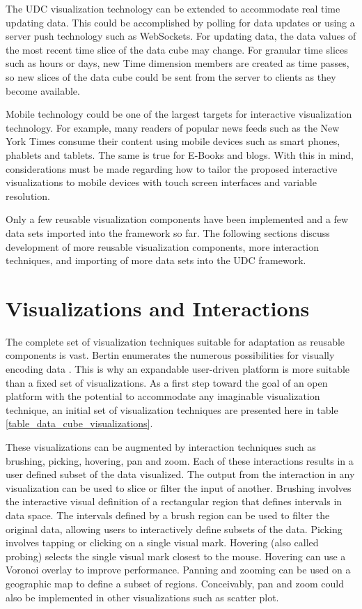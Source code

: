 The UDC visualization technology can be extended to accommodate real time updating data. This could be accomplished by polling for data updates or using a server push technology such as WebSockets. For updating data, the data values of the most recent time slice of the data cube may change. For granular time slices such as hours or days, new Time dimension members are created as time passes, so new slices of the data cube could be sent from the server to clients as they become available.

Mobile technology could be one of the largest targets for interactive visualization technology. For example, many readers of popular news feeds such as the New York Times consume their content using mobile devices such as smart phones, phablets and tablets. The same is true for E-Books and blogs. With this in mind, considerations must be made regarding how to tailor the proposed interactive visualizations to mobile devices with touch screen interfaces and variable resolution.

Only a few reusable visualization components have been implemented and a few data sets imported into the framework so far. The following sections discuss development of more reusable visualization components, more interaction techniques, and importing of more data sets into the UDC framework.

\section{Visualizations and Interactions}
The complete set of visualization techniques suitable for adaptation as reusable components is vast. Bertin enumerates the numerous possibilities for visually encoding data \cite{bertin1983semiology}. This is why an expandable user-driven platform is more suitable than a fixed set of visualizations. As a first step toward the goal of an open platform with the potential to accommodate any imaginable visualization technique, an initial set of visualization techniques are presented here in table \ref{table_data_cube_visualizations}.

These visualizations can be augmented by interaction techniques such as brushing, picking, hovering, pan and zoom. Each of these interactions results in a user defined subset of the data visualized. The output from the interaction in any visualization can be used to slice or filter the input of another. Brushing involves the interactive visual definition of a rectangular region that defines intervals in data space. The intervals defined by a brush region can be used to filter the original data, allowing users to interactively define subsets of the data. Picking involves tapping or clicking on a single visual mark. Hovering (also called probing) selects the single visual mark closest to the mouse. Hovering can use a Voronoi overlay to improve performance. Panning and zooming can be used on a geographic map to define a subset of regions. Conceivably, pan and zoom could also be implemented in other visualizations such as scatter plot.
\newcommand{\thumbnailWidth}{1.2in}
\newcommand{\descWidth}{2.9in}
\newcommand{\descPadding}{\vspace{.3\baselineskip}}


